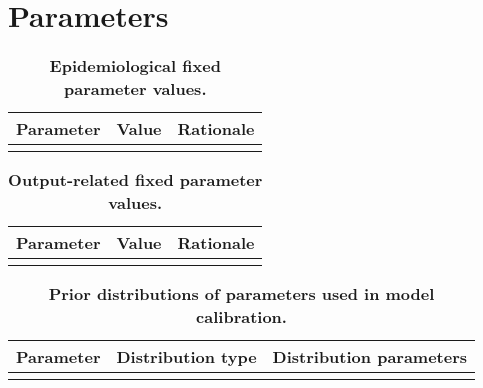 \documentclass{article}
\begin{document}
%
\section{Parameters}


\begin{table}[h]
    \begin{tabularx}{\textwidth}{| X | p{2.5cm} | X |}
    \hline
    \textbf{Parameter} & \textbf{Value} & \textbf{Rationale} \\
    \hline
     \\
    \hline
    \end{tabularx}
	\caption{\textbf{Epidemiological fixed parameter values.}}
    \label{tab:fixed_params}
\end{table}

\begin{table}[h]
    \begin{tabularx}{\textwidth}{| X | p{2.5cm} | X |}
    \hline
    \textbf{Parameter} & \textbf{Value} & \textbf{Rationale} \\
    \hline
     \\
    \hline
    \end{tabularx}
	\caption{\textbf{Output-related fixed parameter values.}}
    \label{tab:output_params}
\end{table}

\begin{table}[h]
    \begin{tabularx}{\textwidth}{| X | p{2.5cm} | X |}
    \hline
    \textbf{Parameter} & \textbf{Distribution type} & \textbf{Distribution parameters} \\
    \hline
     \\
    \hline
    \end{tabularx}
	\caption{\textbf{Prior distributions of parameters used in model calibration.}}
    \label{tab:priors}
\end{table}

\newpage
\printbibliography
\end{document}
